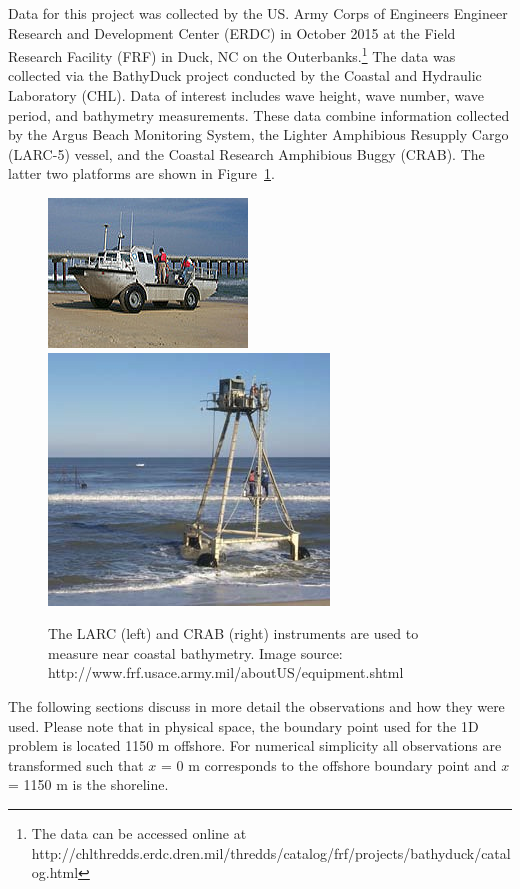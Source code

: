 Data for this project was collected by the US. Army Corps of Engineers Engineer Research and Development Center (ERDC) in October 2015 at the Field Research Facility (FRF) in Duck, NC on the Outerbanks.\footnote{The data can be accessed online at http://chlthredds.erdc.dren.mil/thredds/catalog/frf/projects/bathyduck/catalog.html} The data was collected via the BathyDuck project conducted by the Coastal and Hydraulic Laboratory (CHL). Data of interest includes wave height, wave number, wave period, and bathymetry measurements. These data combine information collected by the Argus Beach Monitoring System, the Lighter Amphibious Resupply Cargo (LARC-5) vessel, and the Coastal Research Amphibious Buggy (CRAB). The latter two platforms are shown in Figure~\ref{crablarc}.

\begin{figure}[h]
\includegraphics[width=.48\linewidth]{img/LARC.jpg}\hfill
\includegraphics[width=.48\linewidth]{img/CRAB2.JPG}
\caption{The LARC (left) and CRAB (right) instruments are used to measure near coastal bathymetry. Image source: http://www.frf.usace.army.mil/aboutUS/equipment.shtml}
\label{crablarc}
\end{figure}

The following sections discuss in more detail the observations and how they were used. Please note that in physical space, the boundary point used for the 1D problem is located 1150 m offshore. For numerical simplicity all observations are transformed such that $\textit{x}$ = 0 m corresponds to the offshore boundary point and $\textit{x}$ = 1150 m is the shoreline. 

